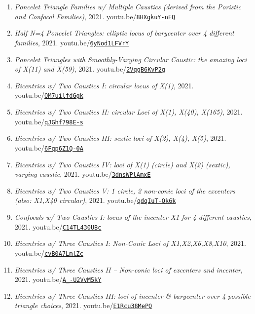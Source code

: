 \documentclass[12pt]{article}
\begin{document}
\begin{enumerate}[resume]
\item \textit{Poncelet Triangle Families w/ Multiple Caustics (derived from the Poristic and Confocal Families)}, 2021. youtu.be/\href{https://youtu.be/8HXgkuY-nFQ}{\nolinkurl{8HXgkuY-nFQ}}
\item \textit{Half N=4 Poncelet Triangles: elliptic locus of barycenter over 4 different families}, 2021. youtu.be/\href{https://youtu.be/6yNod1LFVrY}{\nolinkurl{6yNod1LFVrY}}
\item \textit{Poncelet Triangles with Smoothly-Varying Circular Caustic: the amazing loci of X(11) and X(59)}, 2021. youtu.be/\href{https://youtu.be/2VqgB6KvP2g}{\nolinkurl{2VqgB6KvP2g}}
\item \textit{Bicentrics w/ Two Caustics I: circular locus of X(1)}, 2021. youtu.be/\href{https://youtu.be/OM7uilfdGgk}{\nolinkurl{OM7uilfdGgk}}
\item \textit{Bicentrics w/ Two Caustics II: circular Loci of X(1), X(40), X(165)}, 2021. youtu.be/\href{https://youtu.be/qJGhf798E-s}{\nolinkurl{qJGhf798E-s}}
\item \textit{Bicentrics w/ Two Caustics III: sextic loci of X(2), X(4), X(5)}, 2021. youtu.be/\href{https://youtu.be/6Fqp6Z1Q-0A}{\nolinkurl{6Fqp6Z1Q-0A}}
\item \textit{Bicentrics w/ Two Caustics IV: loci of X(1) (circle) and X(2) (sextic), varying caustic}, 2021. youtu.be/\href{https://youtu.be/3dnsWPlAmxE}{\nolinkurl{3dnsWPlAmxE}}
\item \textit{Bicentrics w/ Two Caustics V: 1 circle, 2 non-conic loci of the excenters (also: X1,X40 circular)}, 2021. youtu.be/\href{https://youtu.be/qdqIuT-Qk6k}{\nolinkurl{qdqIuT-Qk6k}}
\item \textit{Confocals w/ Two Caustics I: locus of the incenter X1 for 4 different caustics}, 2021. youtu.be/\href{https://youtu.be/C14TL430UBc}{\nolinkurl{C14TL430UBc}}
\item \textit{Bicentrics w/ Three Caustics I: Non-Conic Loci of X1,X2,X6,X8,X10}, 2021. youtu.be/\href{https://youtu.be/cvB0A7LmlZc}{\nolinkurl{cvB0A7LmlZc}}
\item \textit{Bicentrics w/ Three Caustics II -- Non-conic loci of excenters and  incenter}, 2021. youtu.be/\href{https://youtu.be/A_-U2VvM5kY}{\nolinkurl{A\_-U2VvM5kY}}
\item \textit{Bicentrics w/ Three Caustics III: loci of incenter \& barycenter over 4 possible triangle choices}, 2021. youtu.be/\href{https://youtu.be/E1Rcu38MePQ}{\nolinkurl{E1Rcu38MePQ}}

\end{enumerate}
\end{document}
